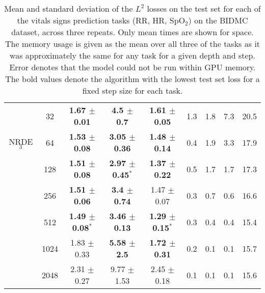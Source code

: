 \documentclass{article}
\begin{document}
\begin{table*}[t]
\begin{center}
\begin{tabular}{ccccccccc}
          & 32   & \textbf{1.67 $\pm$ 0.01} &     \textbf{4.5 $\pm$ 0.7} &  \textbf{1.61 $\pm$ 0.05} &           1.3 &           1.8 &           7.3 &               20.5 \\
        NRDE$_3$  & 64   &  \textbf{1.53 $\pm$ 0.08} &   \textbf{3.05 $\pm$ 0.36} &  \textbf{1.48 $\pm$ 0.14} &           0.4 &           1.9 &           3.3 &               17.9 \\
          & 128  &  \textbf{1.51 $\pm$ 0.08} &   \textbf{2.97 $\pm$ 0.45}$^*$ &  \textbf{1.37 $\pm$ 0.22} &           0.5 &           1.7 &           1.7 &               17.3 \\
          & 256  &  \textbf{1.51 $\pm$ 0.06} &    \textbf{3.4 $\pm$ 0.74} &  1.47 $\pm$ 0.07 &           0.3 &           0.7 &           0.6 &               16.6 \\
          & 512  &  \textbf{1.49 $\pm$ 0.08}$^*$ &   \textbf{3.46 $\pm$ 0.13} &  \textbf{1.29 $\pm$ 0.15}$^*$ &           0.3 &           0.4 &           0.4 &               15.4 \\
          & 1024 &  1.83 $\pm$ 0.33 &    \textbf{5.58 $\pm$ 2.5} &  \textbf{1.72 $\pm$ 0.31} &           0.2 &           0.1 &           0.1 &               15.7 \\
          & 2048 &  2.31 $\pm$ 0.27 &   9.77 $\pm$ 1.53 &  2.45 $\pm$ 0.18 &           0.1 &           0.1 &           0.1 &               15.6 \\
        \bottomrule
        \end{tabular}
    \end{center}
    \caption{Mean and standard deviation of the $L^2$ losses on the test set for each of the vitals signs prediction tasks (RR, HR, SpO$_2$) on the BIDMC dataset, across three repeats. Only mean times are shown for space. The memory usage is given as the mean over all three of the tasks as it was approximately the same for any task for a given depth and step. Error denotes that the model could not be run within GPU memory. The bold values denote the algorithm with the lowest test set loss for a fixed step size for each task.}
    \label{tab:bidmc_all}
\end{table*} 












  
\end{document}
